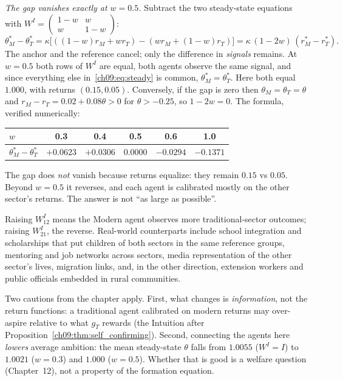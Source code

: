 \documentclass[../solutions_manual.tex]{subfiles}
\begin{document}
 \emph{The gap vanishes exactly at $w = 0.5$.} Subtract the two steady-state equations with $W^I = \begin{pmatrix}1-w & w\\ w & 1-w\end{pmatrix}$:
\[
\theta_M^* - \theta_T^* = \kappa\bigl[((1-w)r_M + wr_T) - (wr_M + (1-w)r_T)\bigr] = \kappa\,(1 - 2w)\,(r_M^* - r_T^*).
\]
The anchor and the reference cancel; only the difference in \emph{signals} remains. At $w = 0.5$ both rows of $W^I$ are equal, both agents observe the same signal, and since everything else in~\eqref{ch09:eq:steady} is common, $\theta_M^* = \theta_T^*$. Here both equal $1.000$, with returns $(0.15, 0.05)$. Conversely, if the gap is zero then $\theta_M = \theta_T = \theta$ and $r_M - r_T = 0.02 + 0.08\theta > 0$ for $\theta > -0.25$, so $1 - 2w = 0$. The formula, verified numerically:
\begin{center}
\begin{tabular}{lccccc}
\toprule
$w$ & 0.3 & 0.4 & 0.5 & 0.6 & 1.0 \\
\midrule
$\theta_M^* - \theta_T^*$ & $+0.0623$ & $+0.0306$ & $0.0000$ & $-0.0294$ & $-0.1371$ \\
\bottomrule
\end{tabular}
\end{center}
The gap does \emph{not} vanish because returns equalize: they remain $0.15$ vs $0.05$. Beyond $w = 0.5$ it reverses, and each agent is calibrated mostly on the other sector's returns. The answer is not ``as large as possible''.

 Raising $W^I_{12}$ means the Modern agent observes more traditional-sector outcomes; raising $W^I_{21}$, the reverse. Real-world counterparts include school integration and scholarships that put children of both sectors in the same reference groups, mentoring and job networks across sectors, media representation of the other sector's lives, migration links, and, in the other direction, extension workers and public officials embedded in rural communities.

Two cautions from the chapter apply. First, what changes is \emph{information}, not the return functions: a traditional agent calibrated on modern returns may over-aspire relative to what $g_T$ rewards (the Intuition after Proposition~\ref{ch09:thm:self_confirming}). Second, connecting the agents here \emph{lowers} average ambition: the mean steady-state $\theta$ falls from $1.0055$ ($W^I = I$) to $1.0021$ ($w = 0.3$) and $1.000$ ($w = 0.5$). Whether that is good is a welfare question (Chapter~12), not a property of the formation equation.
\end{document}
